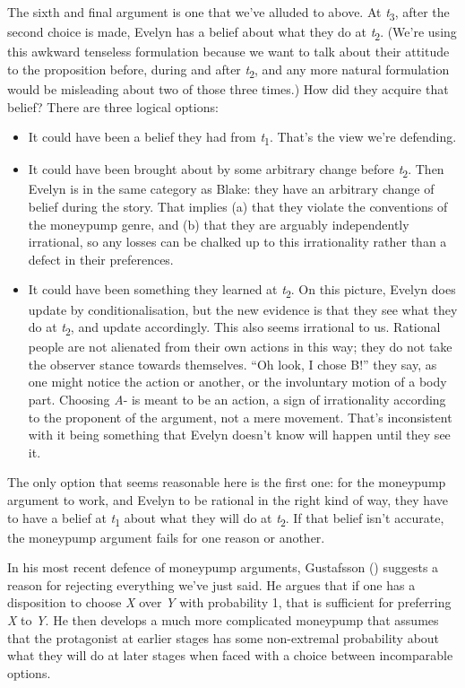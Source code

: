 \documentclass[
  11pt,
  letterpaper,
  DIV=11,
  numbers=noendperiod,
  twoside]{scrartcl}
\providecommand{\tightlist}{%
  \setlength{\itemsep}{0pt}\setlength{\parskip}{0pt}}
\begin{document}
The sixth and final argument is one that we've alluded to above. At
\emph{t}\textsubscript{3}, after the second choice is made, Evelyn has a
belief about what they do at \emph{t}\textsubscript{2}. (We're using
this awkward tenseless formulation because we want to talk about their
attitude to the proposition before, during and after
\emph{t}\textsubscript{2}, and any more natural formulation would be
misleading about two of those three times.) How did they acquire that
belief? There are three logical options:

\begin{itemize}
\tightlist
\item
  It could have been a belief they had from \emph{t}\textsubscript{1}.
  That's the view we're defending.
\item
  It could have been brought about by some arbitrary change before
  \emph{t}\textsubscript{2}. Then Evelyn is in the same category as
  Blake: they have an arbitrary change of belief during the story. That
  implies (a) that they violate the conventions of the moneypump genre,
  and (b) that they are arguably independently irrational, so any losses
  can be chalked up to this irrationality rather than a defect in their
  preferences.
\item
  It could have been something they learned at
  \emph{t}\textsubscript{2}. On this picture, Evelyn does update by
  conditionalisation, but the new evidence is that they see what they do
  at \emph{t}\textsubscript{2}, and update accordingly. This also seems
  irrational to us. Rational people are not alienated from their own
  actions in this way; they do not take the observer stance towards
  themselves. ``Oh look, I chose B!'' they say, as one might notice the
  action or another, or the involuntary motion of a body part. Choosing
  \emph{A}- is meant to be an action, a sign of irrationality according
  to the proponent of the argument, not a mere movement. That's
  inconsistent with it being something that Evelyn doesn't know will
  happen until they see it.
\end{itemize}

The only option that seems reasonable here is the first one: for the
moneypump argument to work, and Evelyn to be rational in the right kind
of way, they have to have a belief at \emph{t}\textsubscript{1} about
what they will do at \emph{t}\textsubscript{2}. If that belief isn't
accurate, the moneypump argument fails for one reason or another.

In his most recent defence of moneypump arguments, Gustafsson
() suggests a reason for
rejecting everything we've just said. He argues that if one has a
disposition to choose \emph{X} over \emph{Y} with probability 1, that is
sufficient for preferring \emph{X} to \emph{Y}. He then develops a much
more complicated moneypump that assumes that the protagonist at earlier
stages has some non-extremal probability about what they will do at
later stages when faced with a choice between incomparable options.
\end{document}
